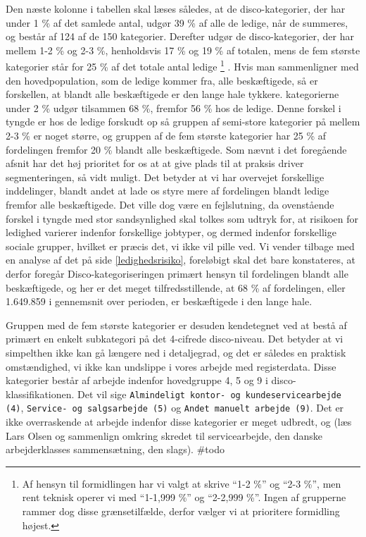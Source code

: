Den næste kolonne i tabellen skal læses således, at de disco-kategorier, der har under 1 \% af det samlede antal, udgør 39 \% af alle de ledige, når de summeres, og består af 124 af de 150 kategorier. Derefter udgør de disco-kategorier, der har mellem 1-2 \% og 2-3 \%, henholdsvis 17 \% og 19 \% af totalen, mens de fem største kategorier står for 25 \% af det totale antal ledige%
%
\footnote{Af hensyn til formidlingen har vi valgt at skrive “1-2 \%” og “2-3 \%”, men rent teknisk operer vi med “1-1,999 \%” og “2-2,999 \%”. Ingen af grupperne rammer dog disse grænsetilfælde, derfor vælger vi at prioritere formidling højest.}%
%
. Hvis man sammenligner med den hovedpopulation, som de ledige kommer fra, alle beskæftigede, så er forskellen, at blandt alle beskæftigede er den lange hale tykkere. kategorierne under 2 \% udgør tilsammen 68 \%, fremfor 56 \% hos de ledige. Denne forskel i tyngde er hos de ledige forskudt op så gruppen af semi-store kategorier på mellem 2-3 \% er noget større, og gruppen af de fem største kategorier har 25 \% af fordelingen fremfor 20 \% blandt alle beskæftigede. Som nævnt i det foregående afsnit har det høj prioritet for os at at give plads til at praksis driver segmenteringen, så vidt muligt.  Det betyder at vi har overvejet forskellige inddelinger, blandt andet at lade os styre mere af fordelingen blandt ledige fremfor alle beskæftigede. Det ville dog være en fejlslutning, da ovenstående forskel i tyngde med stor sandsynlighed skal tolkes som udtryk for, at risikoen for ledighed varierer indenfor forskellige jobtyper, og dermed indenfor forskellige sociale grupper, hvilket er præcis det, vi ikke vil pille ved. Vi vender tilbage med en analyse af det på side \ref{ledighedsrisiko}, foreløbigt skal det bare konstateres, at derfor foregår Disco-kategoriseringen primært hensyn til fordelingen blandt alle beskæftigede, og her er det meget tilfredsstillende, at 68 \% af fordelingen, eller 1.649.859 i gennemsnit over perioden, er beskæftigede i den lange hale.

Gruppen med de fem største kategorier er desuden kendetegnet ved at bestå af primært en enkelt subkategori på det 4-cifrede disco-niveau. Det betyder at vi simpelthen ikke kan gå længere ned i detaljegrad, og det er således en praktisk omstændighed, vi ikke kan undslippe i vores arbejde med registerdata. Disse kategorier består af arbejde indenfor hovedgruppe 4, 5 og 9 i disco-klassifikationen. Det vil sige \texttt{Almindeligt kontor- og kundeservicearbejde (4)}, \texttt{Service- og salgsarbejde (5)} og \texttt{Andet manuelt arbejde (9)}. Det er ikke overraskende at arbejde indenfor disse kategorier er meget udbredt, og (læs Lars Olsen og sammenlign omkring skredet til servicearbejde, den danske arbejderklasses sammensætning, den slags). \#todo




